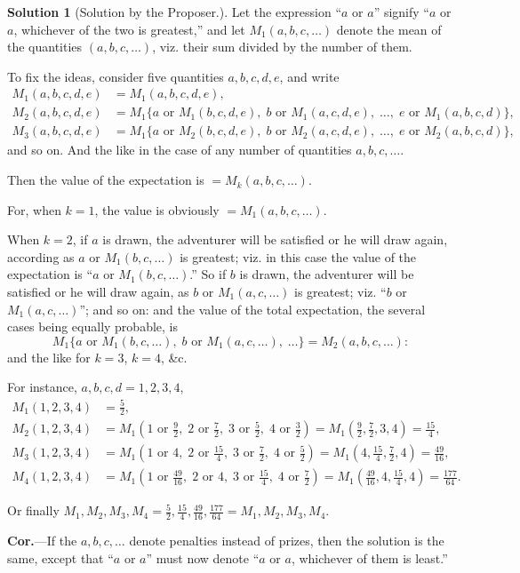 \documentclass[11pt,a4paper]{article}
\theoremstyle{definition}
\newtheorem*{solution}{Solution}
\begin{document}
\begin{solution}[Solution by the Proposer.]
Let the expression ``$a$ or $a$'' signify ``$a$ or $a$, whichever of the two is greatest,'' and let $M_1(a,b,c,\ldots)$ denote the mean of the quantities $(a,b,c,\ldots)$, viz. their sum divided by the number of them.

To fix the ideas, consider five quantities $a,b,c,d,e$, and write
\[
\begin{aligned}
M_1(a,b,c,d,e) &= M_1(a,b,c,d,e), \\
M_2(a,b,c,d,e) &= M_1\{a \text{ or } M_1(b,c,d,e), \; b \text{ or } M_1(a,c,d,e), \; \ldots, \; e \text{ or } M_1(a,b,c,d)\}, \\
M_3(a,b,c,d,e) &= M_1\{a \text{ or } M_2(b,c,d,e), \; b \text{ or } M_2(a,c,d,e), \; \ldots, \; e \text{ or } M_2(a,b,c,d)\},
\end{aligned}
\]
and so on. And the like in the case of any number of quantities $a,b,c,\ldots$.

Then the value of the expectation is $= M_k(a,b,c,\ldots)$.

For, when $k=1$, the value is obviously $=M_1(a,b,c,\ldots)$.

When $k=2$, if $a$ is drawn, the adventurer will be satisfied or he will draw again, according as $a$ or $M_1(b,c,\ldots)$ is greatest; viz. in this case the value of the expectation is ``$a$ or $M_1(b,c,\ldots)$.'' So if $b$ is drawn, the adventurer will be satisfied or he will draw again, as $b$ or $M_1(a,c,\ldots)$ is greatest; viz. ``$b$ or $M_1(a,c,\ldots)$''; and so on: and the value of the total expectation, the several cases being equally probable, is
\[
M_1\{a \text{ or } M_1(b,c,\ldots), \; b \text{ or } M_1(a,c,\ldots), \; \ldots\} = M_2(a,b,c,\ldots):
\]
and the like for $k=3$, $k=4$, \&c.

For instance, $a,b,c,d = 1,2,3,4$,
\[
\begin{aligned}
M_1(1,2,3,4) &= \tfrac{5}{2}, \\
M_2(1,2,3,4) &= M_1(1\text{ or }\tfrac{9}{2},\; 2\text{ or }\tfrac{7}{2},\; 3\text{ or }\tfrac{5}{2},\; 4\text{ or }\tfrac{3}{2}) = M_1(\tfrac{9}{2}, \tfrac{7}{2}, 3, 4) = \tfrac{15}{4}, \\
M_3(1,2,3,4) &= M_1(1\text{ or }4,\; 2\text{ or }\tfrac{15}{4},\; 3\text{ or }\tfrac{7}{2},\; 4\text{ or }\tfrac{5}{2}) = M_1(4, \tfrac{15}{4}, \tfrac{7}{2}, 4) = \tfrac{49}{16}, \\
M_4(1,2,3,4) &= M_1(1\text{ or }\tfrac{49}{16},\; 2\text{ or }4,\; 3\text{ or }\tfrac{15}{4},\; 4\text{ or }\tfrac{7}{2}) = M_1(\tfrac{49}{16}, 4, \tfrac{15}{4}, 4) = \tfrac{177}{64}.
\end{aligned}
\]

Or finally $M_1, M_2, M_3, M_4 = \tfrac{5}{2}, \tfrac{15}{4}, \tfrac{49}{16}, \tfrac{177}{64} = M_1, M_2, M_3, M_4$.

\medskip

\textbf{Cor.}---If the $a,b,c,\ldots$ denote penalties instead of prizes, then the solution is the same, except that ``$a$ or $a$'' must now denote ``$a$ or $a$, whichever of them is least.''
\end{solution}
\end{document}
